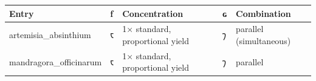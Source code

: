 \documentclass[12pt,a4paper]{article}
\begin{document}
\begin{longtable}[]{@{}lllll@{}}
\toprule
\begin{minipage}[b]{0.17\columnwidth}\raggedright
Entry\strut
\end{minipage} & \begin{minipage}[b]{0.17\columnwidth}\raggedright
ƒ\strut
\end{minipage} & \begin{minipage}[b]{0.17\columnwidth}\raggedright
Concentration\strut
\end{minipage} & \begin{minipage}[b]{0.17\columnwidth}\raggedright
ɢ\strut
\end{minipage} & \begin{minipage}[b]{0.17\columnwidth}\raggedright
Combination\strut
\end{minipage}\tabularnewline
\midrule
\endhead
\begin{minipage}[t]{0.17\columnwidth}\raggedright
artemisia\_absinthium\strut
\end{minipage} & \begin{minipage}[t]{0.17\columnwidth}\raggedright
𐑱\strut
\end{minipage} & \begin{minipage}[t]{0.17\columnwidth}\raggedright
1× standard, proportional yield\strut
\end{minipage} & \begin{minipage}[t]{0.17\columnwidth}\raggedright
𐑠\strut
\end{minipage} & \begin{minipage}[t]{0.17\columnwidth}\raggedright
parallel (simultaneous)\strut
\end{minipage}\tabularnewline
\begin{minipage}[t]{0.17\columnwidth}\raggedright
mandragora\_officinarum\strut
\end{minipage} & \begin{minipage}[t]{0.17\columnwidth}\raggedright
𐑱\strut
\end{minipage} & \begin{minipage}[t]{0.17\columnwidth}\raggedright
1× standard, proportional yield\strut
\end{minipage} & \begin{minipage}[t]{0.17\columnwidth}\raggedright
𐑠\strut
\end{minipage} & \begin{minipage}[t]{0.17\columnwidth}\raggedright
parallel\strut
\end{minipage}\tabularnewline

\end{longtable}
\end{document}
